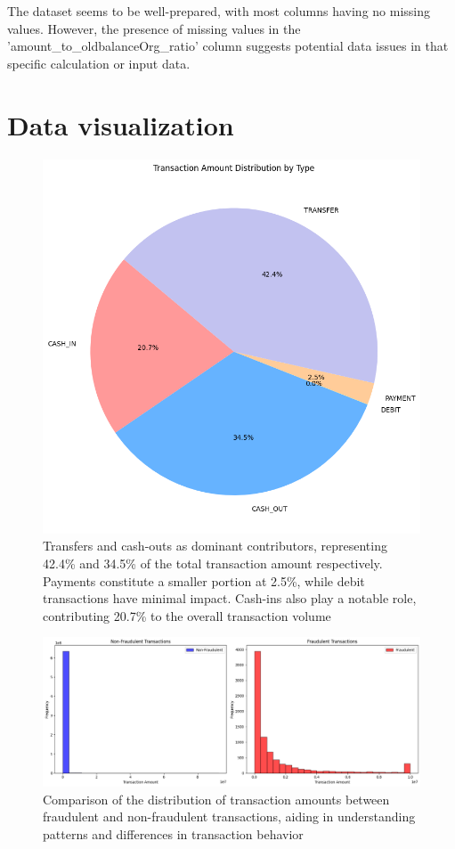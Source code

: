 The dataset seems to be well-prepared, with most columns having no missing values. However, the presence of missing values in the 'amount\_to\_oldbalanceOrg\_ratio' column suggests potential data issues in that specific calculation or input data.\\


\section{Data visualization}

\begin{figure}[H]
	\centering
	\includegraphics[width=0.7\linewidth]{chap4/1}
	\caption{Transfers and cash-outs as dominant contributors, representing 42.4\% and 34.5\% of the total transaction amount respectively. Payments constitute a smaller portion at 2.5\%, while debit transactions have minimal impact. Cash-ins also play a notable role, contributing 20.7\% to the overall transaction volume}
	\label{fig:1}
\end{figure}

\begin{figure}[H]
	\centering
	\includegraphics[width=0.7\linewidth]{chap4/2}
	\caption{Comparison of the distribution of transaction amounts between fraudulent and non-fraudulent transactions, aiding in understanding patterns and differences in transaction behavior}
	\label{fig:2}
\end{figure}

